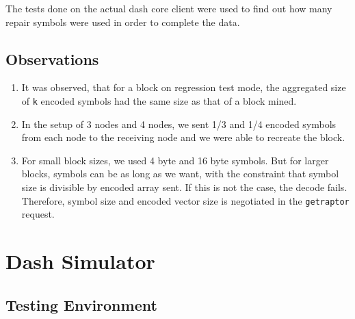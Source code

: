 The tests done on the actual dash core client were used to find out how many
repair symbols were used in order to complete the data.

\subsection{Observations}
\begin{enumerate}
    \item It was observed, that for a block on regression
        test mode, the aggregated size of \texttt{k} encoded symbols had the same size as that of a block mined.
    \item In the setup of 3 nodes and 4 nodes, we sent 1/3 and 1/4 encoded
        symbols from each node to the receiving node and we were able to
        recreate the block.
    \item For small block sizes, we used 4 byte and 16 byte symbols. But for
        larger blocks, symbols can be as long as we want, with the constraint
        that symbol size is divisible by encoded array sent. If this is not the
        case, the decode fails. Therefore, symbol size and encoded vector size
        is negotiated in the \texttt{getraptor} request.
\end{enumerate}

\section{Dash Simulator}

\subsection{Testing Environment}

